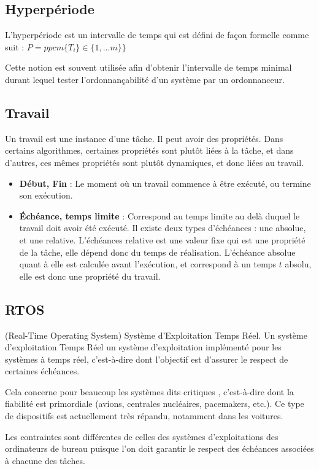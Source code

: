 \documentclass[11pt,a4paper,oneside]{report}
\begin{document}
	\subsection{Hyperpériode}
	L'hyperpériode est un intervalle de temps qui est défini de façon formelle comme suit :\medskip
	$P = ppcm\{T_i\} \in \{1,... m\}\}$
	
	Cette notion est souvent utilisée afin d'obtenir l'intervalle de temps 
	minimal durant lequel tester l'ordonnançabilité d'un système par un ordonnanceur.
	
	\subsection{Travail}
	Un travail est une instance d'une tâche. 
	Il peut avoir des propriétés. 
	Dans certains algorithmes, certaines propriétés sont plutôt liées à la tâche, 
	et dans d'autres, ces mêmes propriétés sont plutôt dynamiques, et donc liées au travail.
	\begin{itemize}
		\item \textbf{Début, Fin} : Le moment où un travail commence à être exécuté, ou termine son exécution.
		\item \textbf{Échéance, temps limite} : Correspond au temps limite au delà duquel le travail doit avoir été exécuté. Il existe deux types d'échéances : 
		une absolue, et une relative. L'échéances relative est une valeur fixe qui 
		est une propriété de la tâche, elle dépend donc du temps de réalisation.\medskip
		L'échéance absolue quant à elle est calculée avant l'exécution, et correspond 
		à un temps $t$ absolu, elle est donc une propriété du travail.
	\end{itemize}
	
	\subsection{RTOS}
	(Real-Time Operating System) Système d'Exploitation Temps Réel.\medskip
	Un système d'exploitation Temps Réel un système d'exploitation implémenté pour les systèmes 
	à temps réel, c'est-à-dire dont l'objectif est d'assurer le respect de certaines échéances. 
	
	Cela concerne pour beaucoup les systèmes dits \og critiques\fg{} , c'est-à-dire dont la fiabilité 
	est primordiale (avions, centrales nucléaires, pacemakers, etc.). Ce type de dispositifs 
	est actuellement très répandu, notamment dans les voitures.
	
	
	Les contraintes sont différentes de celles des systèmes d'exploitations des ordinateurs 
	de bureau puisque l'on doit garantir le respect des échéances associées à chacune des tâches. 
	
\end{document}

